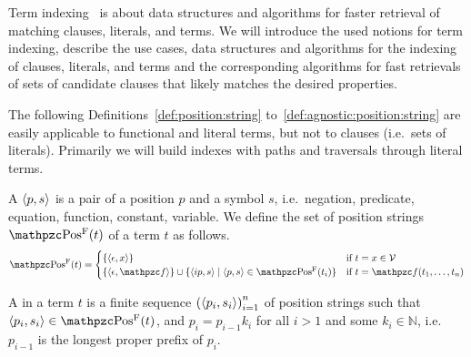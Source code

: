 	Term indexing~\cite{Graf1998} is about data structures and algorithms
	for faster retrieval of matching clauses, literals, and terms.
	We will introduce the used notions for term indexing, describe
	the use cases, data structures and algorithms for the indexing
	of clauses, literals, and terms and the corresponding algorithms
	for fast retrievals of sets of candidate clauses that likely matches the desired properties.

	\begin{remark}
		The following Definitions~\ref{def:position:string} to~\ref{def:agnostic:position:string}
		are easily applicable to functional and literal terms, but not to clauses (i.e.\ sets of literals).
		Primarily we will build indexes with paths and traversals through literal terms.
	\end{remark}

	\begin{definition}\label{def:position:string}
		A  \( \langle p, s \rangle \)
		is a pair of a position \( p \) and a symbol \( s \),
		i.e.~negation, predicate, equation, function, constant, variable.
%
		We define the set of position strings \(\PosStr(t)\)
		of a term \( t \) as follows.
		\begin{gather*}
		\PosStr(t) =
		\begin{cases}
		\{ \ANGLES{\epsilon,x} \}
		& \text{if }t=x\in\SIGV \\
		\{ \ANGLES{\epsilon, \mcf} \} \cup \{ \ANGLES{ip,s}\mid \ANGLES{p,s} \in\PosStr(t_i)\}
		&\text{if }t=\mcf(t_1,\ldots,t_n)
		\end{cases}
		\end{gather*}
	\end{definition}



	\begin{definition}\label{def:term:path}
		A  in a term \( t \)
		is a finite sequence
		\( {( \langle p_i,s_i\rangle )}^{n}_{i=1}
			\)
		of position strings such that
		\( \ANGLES{p_i,s_i} \in \PosStr(t) \),
		and \( p_i = p_{i-1} k_i \)
		for all \( i > 1 \)
		and some \( k_i \in\mathbb{N} \),
		i.e.~\(p_{i-1}\) is the longest proper prefix of \(p_{i}\).


	\end{definition}

